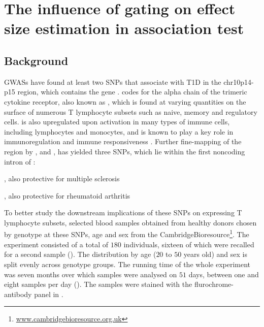 \chapter{ \label{chapter:il2ra} The influence of gating on effect size estimation in association test }

\section{Background}

\Glspl{GWAS} have found at least two \glspl{SNP} that associate with T1D in the chr10p14-p15 region, which contains the  gene \citep{Lowe:2007ij}.
 codes for the alpha chain of the trimeric  cytokine receptor, also known as ,  
which is found at varying quantities on the surface of numerous T lymphocyte subsets such as naive, memory and
regulatory cells.
 is also upregulated upon activation in many types of immune cells, including lymphocytes and monocytes, 
and is known to play a key role in immunoregulation and immune responsiveness \citep{Brusko:2009bn,Boyman:2012cy}.
Further fine-mapping of the  region by \citet{Lowe:2007ij}, \cite{Smyth:2008kx} and \cite{Maier:2009hh}, has yielded three SNPs, which lie within
the first noncoding intron of :
\begin{itemise}
  \item {}  
  \item {}, also protective for multiple sclerosis \citep{Beecham:2013hh}
  \item {}, also protective for rheumatoid arthritis \citep{Stahl:2010dy}
\end{itemise}


To better study the downstream implications of these SNPs on  expressing T lymphocyte 
subsets, \citet{Dendrou:2009dv} selected blood samples obtained from healthy donors
chosen by genotype at these SNPs, age and sex from the CambridgeBioresource\footnote{\url{www.cambridgebioresource.org.uk}}.
The experiment consisted of a total of $180$ individuals, sixteen of which were recalled for a second sample ().
The distribution by age ($20$ to $50$ years old) and sex is split evenly across genotype groups.  
The running time of the whole experiment was seven months over which samples were analysed on $51$ days,
between one and eight samples per day ().  
The samples were stained with the flurochrome-antibody panel in .

